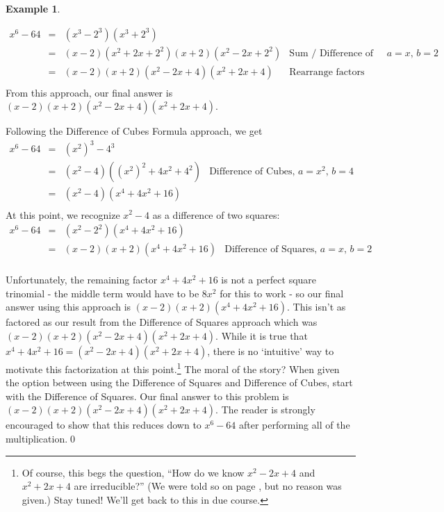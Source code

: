 \documentclass[11pt]{article}
\theoremstyle{definition}  %
\newtheorem{ex}{\bf Example}
\begin{document}
\begin{ex}
\begin{enumerate}
\[\begin{array}{rclr}
x^6 - 64 & = & (x^3 - 2^3)(x^3 + 2^3) & \\
         & = & (x-2)(x^2+2x+2^2)(x+2)(x^2 - 2x + 2^2) & \text{Sum / Difference of Cubes, $a = x$, $b = 2$} \\ 
				 & = & (x-2)(x+2)(x^2-2x+4)(x^2+2x+4) & \text{Rearrange factors} \\ 
\end{array} \] From this approach, our final answer is $(x-2)(x+2)(x^2-2x+4)(x^2+2x+4)$.  

\smallskip

Following the Difference of Cubes Formula approach, we get \[ \begin{array}{rclr}

x^6 - 64 & = & (x^2)^3 - 4^3 & \\
         & = & (x^2 - 4)((x^2)^2 + 4x^2 + 4^2) & \text{Difference of Cubes, $a = x^2$, $b = 4$} \\ 
         & = & (x^2 - 4)(x^4 + 4x^2 + 16) & \\ 
\end{array} \] At this point, we recognize $x^2 - 4$ as a difference of two squares: \[ \begin{array}{rclr}

x^6 - 64 & = & (x^2 - 2^2)(x^4 + 4x^2 + 16)  & \\
         & = & (x-2)(x+2)(x^4 + 4x^2 + 16) & \text{Difference of Squares, $a = x$, $b = 2$} \\ 
 
\end{array} \]

Unfortunately, the remaining factor $x^4 + 4x^2 + 16$ is not a perfect square trinomial - the middle term would have to be $8x^2$ for this to work - so our final answer using this approach is $(x-2)(x+2)(x^4 + 4x^2 + 16)$.   This isn't as factored as our result from the Difference of Squares approach which was $(x-2)(x+2)(x^2-2x+4)(x^2+2x+4)$.  While it is true that $x^4 + 4x^2 + 16 = (x^2-2x+4)(x^2+2x+4)$, there is no `intuitive' way to motivate this factorization at this point.\footnote{Of course, this begs the question, ``How do we know $x^2-2x+4$ and $x^2+2x+4$ are irreducible?'' (We were told so on page \pageref{CommonFactoringFormulas}, but no reason was given.)  Stay tuned!  We'll get back to this in due course.}  The moral of the story?  When given the option between using the Difference of Squares and Difference of Cubes, start with the Difference of Squares.  Our final answer to this problem is  $(x-2)(x+2)(x^2-2x+4)(x^2+2x+4)$.  The reader is strongly encouraged to show that this reduces down to $x^6 - 64$ after performing all of the  multiplication.\qed

\end{enumerate}
\end{ex}
\end{document}
